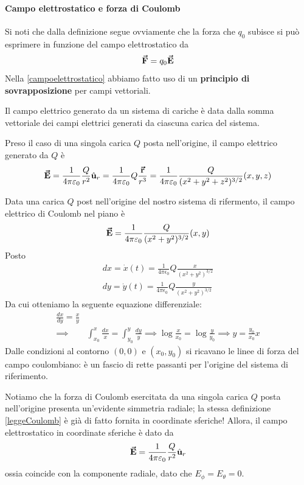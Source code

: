 \paragraph{Campo elettrostatico e forza di Coulomb}
Si noti che dalla definizione segue ovviamente che la forza che $q_0$ subisce si può esprimere in funzione del campo elettrostatico da
\begin{equation}
	\vb*{\va{F}}=q_0\vb*{\va{E}}
\end{equation}
Nella \ref{campoelettrostatico} abbiamo fatto uso di un \textbf{principio di sovrapposizione} per campi vettoriali.
\begin{principle}
	Il campo elettrico generato da un sistema di cariche è data dalla somma vettoriale dei campi elettrici generati da ciascuna carica del sistema.
\end{principle}
Preso il caso di una singola carica $Q$ posta nell'origine, il campo elettrico generato da $Q$ è
\begin{equation*}
	\vb*{\va{E}}=\frac{1}{4\pi\varepsilon_0}\frac{Q}{r^2}\hat{\mathbf{u}}_{r}=\frac{1}{4\pi\varepsilon_0}Q\frac{\vb*{\va{r}}}{r^3}=\frac{1}{4\pi\varepsilon_0}\frac{Q}{(x^2+y^2+z^2)^{3/2}}(x,y,z)
\end{equation*}
\begin{examplewt}
	Data una carica $Q$ post nell'origine del nostro sistema di rifermento, il campo elettrico di Coulomb nel piano è
	\begin{equation*}
		\vb*{\va{E}}=\frac{1}{4\pi\varepsilon_0}\frac{Q}{(x^2+y^2)^{3/2}}(x,y)
	\end{equation*}
Posto
\begin{gather*}
	dx=\dot{x}(t)=\frac{1}{4\pi\epsilon_0}Q\frac{x}{(x^2+y^2)^{3/2}}\\
	dy=\dot{y}(t)=\frac{1}{4\pi\epsilon_0}Q\frac{y}{(x^2+y^2)^{3/2}}
\end{gather*}
Da cui otteniamo la seguente equazione differenziale:
\begin{align*}
	\frac{dx}{dy}=\frac{x}{y}&\\
	\implies&\int_{x_0}^{x}\frac{dx}{x}=\int_{y_0}^{y}\frac{dy}{y}\implies \log\frac{x}{x_0}=\log\frac{y}{y_0}\implies y=\frac{y_0}{x_0}x
\end{align*}
Dalle condizioni al contorno $(0,0)$ e $(x_0,y_0)$ si ricavano le linee di forza del campo coulombiano: è un fascio di rette passanti per l'origine del sistema di riferimento.
\end{examplewt}
\begin{observe}
	Notiamo che la forza di Coulomb esercitata da una singola carica $Q$ posta nell'origine presenta un'evidente simmetria radiale; la stessa definizione \ref{leggeCoulomb} è già di fatto fornita in coordinate sferiche! Allora, il campo elettrostatico in coordinate sferiche è dato da
	\begin{equation*}
		\vb*{\va{E}}=\frac{1}{4\pi\varepsilon_0}\frac{Q}{r^2}\hat{\mathbf{u}}_{r}
	\end{equation*}
	ossia coincide con la componente radiale, dato che $E_\phi=E_\theta=0$.
\end{observe}
